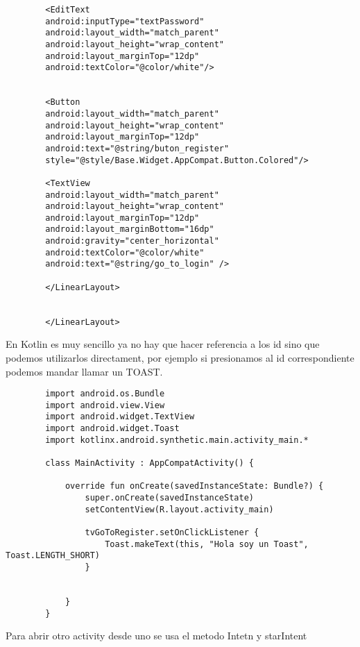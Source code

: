 \documentclass[a4paper]{article}
\begin{document}
\begin{lstlisting}
		<EditText
		android:inputType="textPassword"
		android:layout_width="match_parent"
		android:layout_height="wrap_content"
		android:layout_marginTop="12dp"
		android:textColor="@color/white"/>
		
		
		<Button
		android:layout_width="match_parent"
		android:layout_height="wrap_content"
		android:layout_marginTop="12dp"
		android:text="@string/buton_register"
		style="@style/Base.Widget.AppCompat.Button.Colored"/>
		
		<TextView
		android:layout_width="match_parent"
		android:layout_height="wrap_content"
		android:layout_marginTop="12dp"
		android:layout_marginBottom="16dp"
		android:gravity="center_horizontal"
		android:textColor="@color/white"
		android:text="@string/go_to_login" />
		
		</LinearLayout>
		
		
		</LinearLayout>
	\end{lstlisting}

	En Kotlin es muy sencillo ya no hay que hacer referencia a los id sino que podemos utilizarlos directament, por ejemplo si presionamos al id correspondiente podemos mandar llamar un TOAST.
	
	\begin{lstlisting}
		import android.os.Bundle
		import android.view.View
		import android.widget.TextView
		import android.widget.Toast
		import kotlinx.android.synthetic.main.activity_main.*
		
		class MainActivity : AppCompatActivity() {
			
			override fun onCreate(savedInstanceState: Bundle?) {
				super.onCreate(savedInstanceState)
				setContentView(R.layout.activity_main)
				
				tvGoToRegister.setOnClickListener {
					Toast.makeText(this, "Hola soy un Toast", Toast.LENGTH_SHORT)
				}
				
				
			}
		}
	\end{lstlisting}
	
	
	Para abrir otro activity desde uno se usa el metodo Intetn y starIntent 
	
\end{document}
